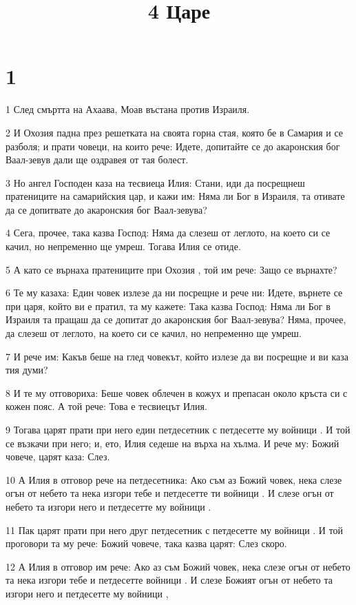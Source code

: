 

\title{4 Царе}


\chapter{1}

\par 1 След смъртта на Ахаава, Моав въстана против Израиля.
\par 2 И Охозия падна през решетката на своята горна стая, която бе в Самария и се разболя; и прати човеци, на които рече: Идете, допитайте се до акаронския бог Ваал-зевув дали ще оздравея от тая болест.
\par 3 Но ангел Господен каза на тесвиеца Илия: Стани, иди да посрещнеш пратениците на самарийския цар, и кажи им: Няма ли Бог в Израиля, та отивате да се допитвате до акаронския бог Ваал-зевува?
\par 4 Сега, прочее, така казва Господ: Няма да слезеш от леглото, на което си се качил, но непременно ще умреш. Тогава Илия се отиде.
\par 5 А като се върнаха пратениците при Охозия , той им рече: Защо се върнахте?
\par 6 Те му казаха: Един човек излезе да ни посрещне и рече ни: Идете, върнете се при царя, който ви е пратил, та му кажете: Така казва Господ: Няма ли Бог в Израиля та пращаш да се допитат до акаронския бог Ваал-зевува? Няма, прочее, да слезеш от леглото, на което си се качил, но непременно ще умреш.
\par 7 И рече им: Какъв беше на глед човекът, който излезе да ви посрещне и ви каза тия думи?
\par 8 И те му отговориха: Беше човек облечен в кожух и препасан около кръста си с кожен пояс. А той рече: Това е тесвиецът Илия.
\par 9 Тогава царят прати при него един петдесетник с петдесетте му войници . И той се възкачи при него; и, ето, Илия седеше на върха на хълма. И рече му: Божий човече, царят каза: Слез.
\par 10 А Илия в отговор рече на петдесетника: Ако съм аз Божий човек, нека слезе огън от небето та нека изгори тебе и петдесетте ти войници . И слезе огън от небето та изгори него и петдесетте му войници .
\par 11 Пак царят прати при него друг петдесетник с петдесетте му войници . И той проговори та му рече: Божий човече, така казва царят: Слез скоро.
\par 12 А Илия в отговор им рече: Ако аз съм Божий човек, нека слезе огън от небето та нека изгори тебе и петдесетте войници . И слезе Божият огън от небето та изгори него и петдесетте му войници ,
